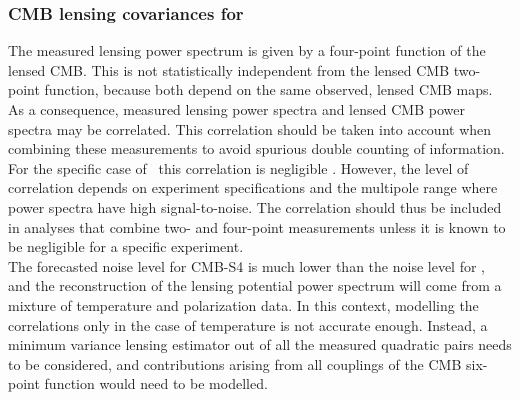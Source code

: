 \subsubsection{CMB lensing covariances for \cmbexp }
\label{se:covs}

The measured lensing power spectrum is given by a four-point function of the lensed CMB. 
This is not statistically independent from the lensed CMB two-point function, because both depend on the same observed, lensed CMB maps. 
As a consequence, measured lensing power spectra and lensed CMB power spectra may be correlated. 
This correlation should be taken into account when combining these measurements to avoid spurious double counting of information. 
For the specific case of \planck\ this correlation is negligible \cite{Schmittfull:2013uea}. 
However, the level of correlation depends on experiment specifications and the multipole range where power spectra have high signal-to-noise. 
The correlation should thus be included in analyses that combine two- and four-point measurements unless it is known to be negligible for a specific experiment.
\\

The forecasted noise level for CMB-S4 is much lower than the noise level for \planck, and the reconstruction of the lensing potential power spectrum will come from a mixture of temperature and polarization data.
In this context, modelling the correlations only in the case of temperature is not accurate enough.
Instead, a minimum variance lensing estimator out of all the measured quadratic pairs needs to be considered, and contributions arising from all couplings of the CMB six-point function would need to be modelled.
\\

